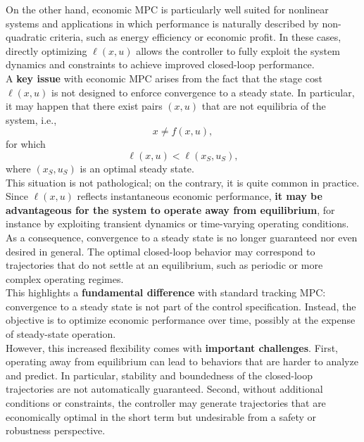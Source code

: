 On the other hand, economic MPC is particularly well suited for nonlinear systems and applications in which performance is naturally described by non-quadratic criteria, such as energy efficiency or economic profit. In these cases, directly optimizing $\ell(x,u)$ allows the controller to fully exploit the system dynamics and constraints to achieve improved closed-loop performance.\\

A \textbf{key issue} with economic MPC arises from the fact that the stage cost $\ell(x,u)$ is not designed to enforce convergence to a steady state. In particular, it may happen that there exist pairs $(x,u)$ that are not equilibria of the system, i.e.,
\[
x \neq f(x,u),
\]
for which
\[
\ell(x,u) < \ell(x_S,u_S),
\]
where $(x_S,u_S)$ is an optimal steady state.\\
This situation is not pathological; on the contrary, it is quite common in practice. Since $\ell(x,u)$ reflects instantaneous economic performance, \textbf{it may be advantageous for the system to operate away from equilibrium}, for instance by exploiting transient dynamics or time-varying operating conditions.\\

As a consequence, convergence to a steady state is no longer guaranteed nor even desired in general. The optimal closed-loop behavior may correspond to trajectories that do not settle at an equilibrium, such as periodic or more complex operating regimes.\\
This highlights a \textbf{fundamental difference} with standard tracking MPC: convergence to a steady state is not part of the control specification. Instead, the objective is to optimize economic performance over time, possibly at the expense of steady-state operation.\\

However, this increased flexibility comes with \textbf{important challenges}. First, operating away from equilibrium can lead to behaviors that are harder to analyze and predict. In particular, stability and boundedness of the closed-loop trajectories are not automatically guaranteed. Second, without additional conditions or constraints, the controller may generate trajectories that are economically optimal in the short term but undesirable from a safety or robustness perspective.

